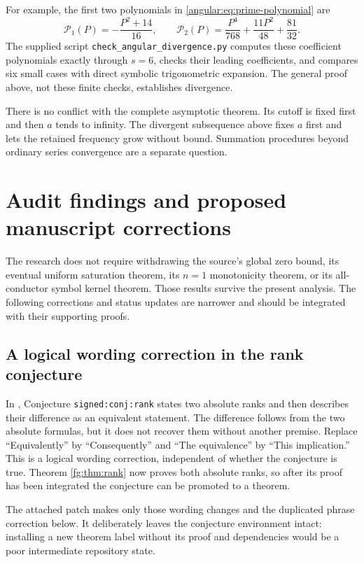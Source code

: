 \documentclass[11pt,a4paper]{article}
\theoremstyle{definition}
\theoremstyle{remark}
\numberwithin{equation}{section}
\begin{document}
For example, the first two polynomials in
\eqref{angular:eq:prime-polynomial} are
\[
 \mathcal P_1(P)=-\frac{P^2+14}{16},\qquad
 \mathcal P_2(P)=\frac{P^4}{768}+\frac{11P^2}{48}
                   +\frac{81}{32}.
\]
The supplied script \texttt{check\_angular\_divergence.py} computes
these coefficient polynomials exactly through $s=6$, checks their
leading coefficients, and compares six small cases with direct
symbolic trigonometric expansion. The general proof above, not
these finite checks, establishes divergence.

There is no conflict with the complete asymptotic theorem. Its
cutoff is fixed first and then $a$ tends to infinity. The divergent
subsequence above fixes $a$ first and lets the retained frequency
grow without bound. Summation procedures beyond ordinary series
convergence are a separate question.
\section{Audit findings and proposed manuscript corrections}
\label{audit:sec:corrections}

The research does not require withdrawing the source's global zero
bound, its eventual uniform saturation theorem, its $n=1$ monotonicity
theorem, or its all-conductor symbol kernel theorem. Those results
survive the present analysis. The following corrections and status
updates are narrower and should be integrated with their supporting
proofs.

\subsection{A logical wording correction in the rank conjecture}

In , Conjecture
\texttt{signed:conj:rank} states two absolute ranks and then describes
their difference as an equivalent statement. The difference follows
from the two absolute formulas, but it does not recover them without
another premise. Replace ``Equivalently'' by ``Consequently'' and
``The equivalence'' by ``This implication.'' This is a logical wording
correction, independent of whether the conjecture is true. Theorem
\ref{fg:thm:rank} now proves both absolute ranks, so after its proof
has been integrated the conjecture can be promoted to a theorem.

The attached patch makes only those wording changes and the duplicated
phrase correction below. It deliberately leaves the conjecture
environment intact: installing a new theorem label without its proof
and dependencies would be a poor intermediate repository state.
\end{document}
